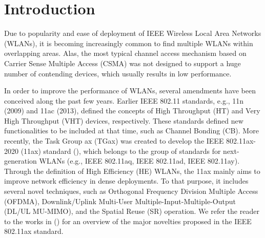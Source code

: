 \documentclass[preprint,12pt]{elsarticle}
\begin{document}
	\newpage	
		
	\section{Introduction}
	\label{section:intro}
	
	
	Due to popularity and ease of deployment of IEEE Wireless Local Area Networks (WLANs), it is becoming increasingly common to find multiple WLANs within overlapping areas. Alas, the most typical channel access mechanism based on Carrier Sense Multiple Access (CSMA) was not designed to support a huge number of contending devices, which usually results in low performance.
	
	In order to improve the performance of WLANs, several amendments have been conceived along the past few years. Earlier IEEE 802.11 standards, e.g., 11n (2009) and 11ac (2013), defined the concepts of High Throughput (HT) and Very High Throughput (VHT) devices, respectively. These standards defined new functionalities to be included at that time, such as Channel Bonding (CB). More recently, the Task Group ax (TGax) was created to develop the IEEE 802.11ax-2020 (11ax) standard (\citealp{tgax2019draft}), which belongs to the group of standards for next-generation WLANs (e.g., IEEE 802.11aq, IEEE 802.11ad, IEEE 802.11ay). Through the definition of High Efficiency (HE) WLANs, the 11ax mainly aims to improve network efficiency in dense deployments. To that purpose, it includes several novel techniques, such as Orthogonal Frequency Division Multiple Access (OFDMA), Downlink/Uplink Multi-User Multiple-Input-Multiple-Output (DL/UL MU-MIMO), and the Spatial Reuse (SR) operation. We refer the reader to the works in (\citealp{bellalta2016ieee, afaqui2016ieee, qu2018survey, khorov2018tutorial}) for an overview of the major novelties proposed in the IEEE 802.11ax standard.
	
\end{document}
